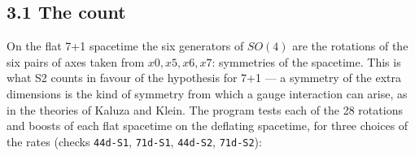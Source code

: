 \documentclass[
  10pt,
]{article}
\begin{document}
\hypertarget{the-count}{%
\subsection{3.1 The count}\label{the-count}}

On the flat 7+1 spacetime the six generators of \(SO(4)\) are the
rotations of the six pairs of axes taken from \(x0,x5,x6,x7\):
symmetries of the spacetime. This is what S2 counts in favour of the
hypothesis for 7+1 --- a symmetry of the extra dimensions is the kind of
symmetry from which a gauge interaction can arise, as in the theories of
Kaluza and Klein. The program tests each of the 28 rotations and boosts
of each flat spacetime on the deflating spacetime, for three choices of
the rates (checks \texttt{44d-S1}, \texttt{71d-S1}, \texttt{44d-S2},
\texttt{71d-S2}):
\end{document}
